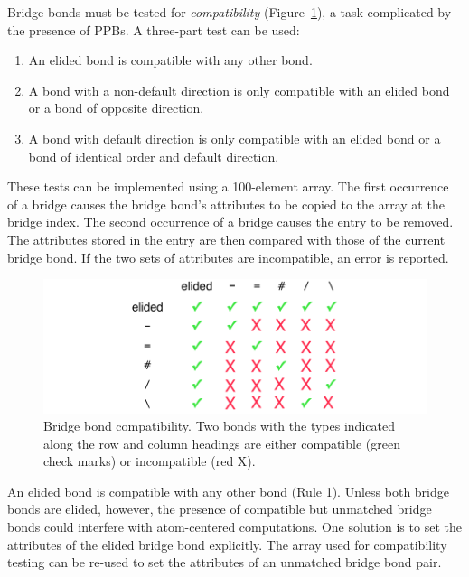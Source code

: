 \documentclass{article}
\begin{document}
Bridge bonds must be tested for \textit{compatibility} (Figure~\ref{fig:bridge-bond-compatibility}), a task complicated by the presence of PPBs. A three-part test can be used:

\begin{enumerate}
    \item An elided bond is compatible with any other bond.
    \item A bond with a non-default direction is only compatible with an elided bond or a bond of opposite direction.
    \item A bond with default direction is only compatible with an elided bond or a bond of identical order and default direction.
\end{enumerate}

These tests can be implemented using a 100-element array. The first occurrence of a bridge causes the bridge bond's attributes to be copied to the array at the bridge index. The second occurrence of a bridge causes the entry to be removed. The attributes stored in the entry are then compared with those of the current bridge bond. If the two sets of attributes are incompatible, an error is reported.

\begin{figure}
    \centering
    \includegraphics[width=\columnwidth]{brdige-bond-compatibility.pdf}
    \caption{Bridge bond compatibility. Two bonds with the types indicated along the row and column headings are either compatible (green check marks) or incompatible (red X).}
    \label{fig:bridge-bond-compatibility}
\end{figure}

An elided bond is compatible with any other bond (Rule 1). Unless both bridge bonds are elided, however, the presence of compatible but unmatched bridge bonds could interfere with atom-centered computations. One solution is to set the attributes of the elided bridge bond explicitly. The array used for compatibility testing can be re-used to set the attributes of an unmatched bridge bond pair.
\end{document}
